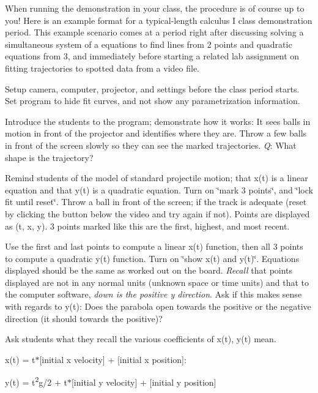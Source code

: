 When running the demonstration in your class, the procedure is of course up to you! Here is an example format for a typical-\/length calculus I class demonstration period. This example scenario comes at a period right after discussing solving a simultaneous system of a equations to find lines from 2 points and quadratic equations from 3, and immediately before starting a related lab assignment on fitting trajectories to spotted data from a video file.

Setup camera, computer, projector, and settings before the class period starts. Set program to hide fit curves, and not show any parametrization information.


\begin{DoxyEnumerate}
\item Introduce the students to the program; demonstrate how it works\+: It sees balls in motion in front of the projector and identifies where they are. Throw a few balls in front of the screen slowly so they can see the marked trajectories. {\itshape Q}\+: What shape is the trajectory?
\item Remind students of the model of standard projectile motion; that x(t) is a linear equation and that y(t) is a quadratic equation. Turn on \char`\"{}mark 3
   points\char`\"{}, and \char`\"{}lock fit until reset\char`\"{}. Throw a ball in front of the screen; if the track is adequate (reset by clicking the button below the video and try again if not). Points are displayed as (t, x, y). 3 points marked like this are the first, highest, and most recent.
\item Use the first and last points to compute a linear x(t) function, then all 3 points to compute a quadratic y(t) function. Turn on \char`\"{}show x(t) and y(t)\char`\"{}. Equations displayed should be the same as worked out on the board. {\itshape Recall} that points displayed are not in any normal units (unknown space or time units) and that to the computer software, {\itshape down is the positive y direction}. Ask if this makes sense with regards to y(t)\+: Does the parabola open towards the positive or the negative direction (it should towards the positive)?
\item Ask students what they recall the various coefficients of x(t), y(t) mean.
\begin{DoxyItemize}
\item x(t) = t$\ast$\mbox{[}initial x velocity\mbox{]} + \mbox{[}initial x position\mbox{]}\+:
\item y(t) = t\textsuperscript{2}g/2 + t$\ast$\mbox{[}initial y velocity\mbox{]} + \mbox{[}initial y position\mbox{]}
\end{DoxyItemize}


\end{DoxyEnumerate}
